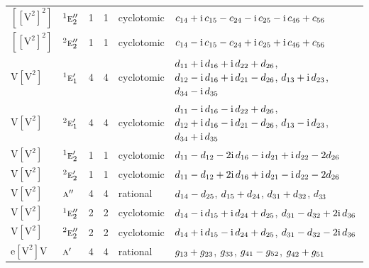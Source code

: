 \documentclass[10pt,a4paper]{article}
\numberwithin{equation}{section}
\newcommand{\irr}[1]{\text{\normalfont\scshape #1}}
\newcommand{\conjpair}[1]{{}^{#1}}
\newcommand{\iunit}{\mathrm{i}}
\newcommand{\jahn}[1]{\mathrm{#1}}
\newlength{\fillwidth}\newlength{\cellwidth}\newlength{\colwidth}
\newcommand{\signbreak}{\penalty100\relax}
\begin{document}
{\begin{longtable}{@{}llrrl>{\RaggedRight\arraybackslash}p{\fillwidth}@{}}
$\jahn{[[V^{2}]^{2}]}$ & $\conjpair{1}\irr{e}_{2}''$ & 1 & 1 & cyclotomic & $c_{14} +\signbreak \iunit{}\,c_{15} -\signbreak c_{24} -\signbreak \iunit{}\,c_{25} -\signbreak \iunit{}\,c_{46} +\signbreak c_{56}$\\
$\jahn{[[V^{2}]^{2}]}$ & $\conjpair{2}\irr{e}_{2}''$ & 1 & 1 & cyclotomic & $c_{14} -\signbreak \iunit{}\,c_{15} -\signbreak c_{24} +\signbreak \iunit{}\,c_{25} +\signbreak \iunit{}\,c_{46} +\signbreak c_{56}$\\
$\jahn{V[V^{2}]}$ & $\conjpair{1}\irr{e}_{1}'$ & 4 & 4 & cyclotomic & $d_{11} +\signbreak \iunit{}\,d_{16} +\signbreak \iunit{}\,d_{22} +\signbreak d_{26}$, $d_{12} -\signbreak \iunit{}\,d_{16} +\signbreak \iunit{}\,d_{21} -\signbreak d_{26}$, $d_{13} +\signbreak \iunit{}\,d_{23}$, $d_{34} -\signbreak \iunit{}\,d_{35}$\\
$\jahn{V[V^{2}]}$ & $\conjpair{2}\irr{e}_{1}'$ & 4 & 4 & cyclotomic & $d_{11} -\signbreak \iunit{}\,d_{16} -\signbreak \iunit{}\,d_{22} +\signbreak d_{26}$, $d_{12} +\signbreak \iunit{}\,d_{16} -\signbreak \iunit{}\,d_{21} -\signbreak d_{26}$, $d_{13} -\signbreak \iunit{}\,d_{23}$, $d_{34} +\signbreak \iunit{}\,d_{35}$\\
$\jahn{V[V^{2}]}$ & $\conjpair{1}\irr{e}_{2}'$ & 1 & 1 & cyclotomic & $d_{11} -\signbreak d_{12} -\signbreak 2\iunit{}\,d_{16} -\signbreak \iunit{}\,d_{21} +\signbreak \iunit{}\,d_{22} -\signbreak 2d_{26}$\\
$\jahn{V[V^{2}]}$ & $\conjpair{2}\irr{e}_{2}'$ & 1 & 1 & cyclotomic & $d_{11} -\signbreak d_{12} +\signbreak 2\iunit{}\,d_{16} +\signbreak \iunit{}\,d_{21} -\signbreak \iunit{}\,d_{22} -\signbreak 2d_{26}$\\
$\jahn{V[V^{2}]}$ & $\irr{a}''$ & 4 & 4 & rational & $d_{14} -\signbreak d_{25}$, $d_{15} +\signbreak d_{24}$, $d_{31} +\signbreak d_{32}$, $d_{33}$\\
$\jahn{V[V^{2}]}$ & $\conjpair{1}\irr{e}_{2}''$ & 2 & 2 & cyclotomic & $d_{14} -\signbreak \iunit{}\,d_{15} +\signbreak \iunit{}\,d_{24} +\signbreak d_{25}$, $d_{31} -\signbreak d_{32} +\signbreak 2\iunit{}\,d_{36}$\\
$\jahn{V[V^{2}]}$ & $\conjpair{2}\irr{e}_{2}''$ & 2 & 2 & cyclotomic & $d_{14} +\signbreak \iunit{}\,d_{15} -\signbreak \iunit{}\,d_{24} +\signbreak d_{25}$, $d_{31} -\signbreak d_{32} -\signbreak 2\iunit{}\,d_{36}$\\
$\jahn{e[V^{2}]V}$ & $\irr{a}'$ & 4 & 4 & rational & $\mathnormal{g}_{13} +\signbreak \mathnormal{g}_{23}$, $\mathnormal{g}_{33}$, $\mathnormal{g}_{41} -\signbreak \mathnormal{g}_{52}$, $\mathnormal{g}_{42} +\signbreak \mathnormal{g}_{51}$\\

\end{longtable}}
\end{document}
